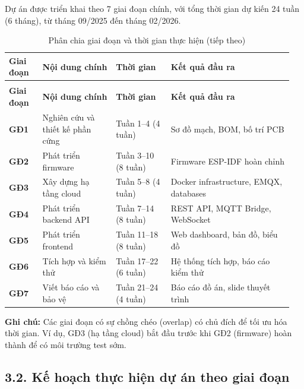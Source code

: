 \documentclass[a4paper]{extarticle}
\newcommand{\thesissettableid}[2]{%
  \renewcommand{\thetable}{#1}%
  \renewcommand{\theHtable}{#2}%
}
\begin{document}
Dự án được triển khai theo 7 giai đoạn chính, với tổng thời gian dự kiến
24 tuần (6 tháng), từ tháng 09/2025 đến tháng 02/2026.


{\thesissettableid{PL-3.1}{tab-app3-phan-chia-giai-oan-va-thoi-gian-thuc-hien}
\def\LTcaptype{table}
\begin{longtable}{|L{0.115\linewidth}|L{0.247\linewidth}|L{0.184\linewidth}|L{0.408\linewidth}|}
\caption{Phân chia giai đoạn và thời gian thực hiện}\label{tab:app3-phan-chia-giai-oan-va-thoi-gian-thuc-hien}\\
\hline \textbf{Giai đoạn} & \textbf{Nội dung chính} & \textbf{Thời gian} & \textbf{Kết quả đầu ra} \\
\hline
\endfirsthead
\caption[]{Phân chia giai đoạn và thời gian thực hiện (tiếp theo)}\\
\hline \textbf{Giai đoạn} & \textbf{Nội dung chính} & \textbf{Thời gian} & \textbf{Kết quả đầu ra} \\
\hline
\endhead
\hline
\endfoot
\endlastfoot
\textbf{GĐ1} & Nghiên cứu và thiết kế phần cứng & Tuần 1--4 (4 tuần) &
Sơ đồ mạch, BOM, bố trí PCB \\\hline
\textbf{GĐ2} & Phát triển firmware & Tuần 3--10 (8 tuần) & Firmware
ESP-IDF hoàn chỉnh \\\hline
\textbf{GĐ3} & Xây dựng hạ tầng cloud & Tuần 5--8 (4 tuần) & Docker
infrastructure, EMQX, databases \\\hline
\textbf{GĐ4} & Phát triển backend API & Tuần 7--14 (8 tuần) & REST API,
MQTT Bridge, WebSocket \\\hline
\textbf{GĐ5} & Phát triển frontend & Tuần 11--18 (8 tuần) & Web
dashboard, bản đồ, biểu đồ \\\hline
\textbf{GĐ6} & Tích hợp và kiểm thử & Tuần 17--22 (6 tuần) & Hệ thống
tích hợp, báo cáo kiểm thử \\\hline
\textbf{GĐ7} & Viết báo cáo và bảo vệ & Tuần 21--24 (4 tuần) & Báo cáo
đồ án, slide thuyết trình \\\hline
\end{longtable}
}


\textbf{Ghi chú:} Các giai đoạn có sự chồng chéo (overlap) có chủ đích
để tối ưu hóa thời gian. Ví dụ, GĐ3 (hạ tầng cloud) bắt đầu trước khi
GĐ2 (firmware) hoàn thành để có môi trường test sớm.

\subsection{3.2. Kế hoạch thực hiện dự án theo giai đoạn}\label{32-kux1ebf-houx1ea1ch-thux1ef1c-hiux1ec7n-dux1ef1-uxe1n-theo-giai-ux111oux1ea1n}
\end{document}
